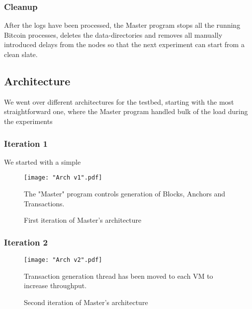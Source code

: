 \subsubsection{Cleanup}

After the logs have been processed, the Master program stops all the running Bitcoin processes, deletes the data-directories and removes all manually introduced delays from the nodes so that the next experiment can start from a clean slate.


\newpage
\subsection{Architecture} \label{impl-testbed-arch}

We went over different architectures for the testbed, starting with the most straightforward one, where the Master program handled bulk of the load during the experiments

\subsubsection{Iteration 1} \label{impl-arch-1}

We started with a simple

\begin{figure}[!htb]
    \centering
    \texttt{[image: "Arch v1".pdf]}
    \caption{First iteration of Master's architecture}
    
    \medskip
    \footnotesize
    The "Master" program controls generation of Blocks, Anchors and Transactions.
    \label{fig-impl-arch-1}
\end{figure}


\newpage
\subsubsection{Iteration 2} \label{impl-arch-1}

\begin{figure}[!htb]
    \centering
    \texttt{[image: "Arch v2".pdf]}
    \caption{Second iteration of Master's architecture}
    
    \medskip
    \footnotesize
    Transaction generation thread has been moved to each VM to increase throughput.
    \label{fig-impl-arch-2}
\end{figure}

